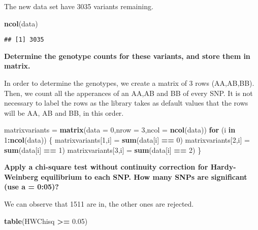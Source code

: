 \documentclass[]{article}
\newenvironment{Shaded}{\begin{snugshade}}{\end{snugshade}}
\newcommand{\KeywordTok}[1]{\textcolor[rgb]{0.13,0.29,0.53}{\textbf{#1}}}
\newcommand{\DataTypeTok}[1]{\textcolor[rgb]{0.13,0.29,0.53}{#1}}
\newcommand{\DecValTok}[1]{\textcolor[rgb]{0.00,0.00,0.81}{#1}}
\newcommand{\FloatTok}[1]{\textcolor[rgb]{0.00,0.00,0.81}{#1}}
\newcommand{\StringTok}[1]{\textcolor[rgb]{0.31,0.60,0.02}{#1}}
\newcommand{\ControlFlowTok}[1]{\textcolor[rgb]{0.13,0.29,0.53}{\textbf{#1}}}
\newcommand{\OperatorTok}[1]{\textcolor[rgb]{0.81,0.36,0.00}{\textbf{#1}}}
\newcommand{\NormalTok}[1]{#1}
\begin{document}
The new data set have 3035 variants remaining.

\begin{Shaded}
\begin{Highlighting}[]
\KeywordTok{ncol}\NormalTok{(data)}
\end{Highlighting}
\end{Shaded}

\begin{verbatim}
## [1] 3035
\end{verbatim}

\textbf{Determine the genotype counts for these variants, and store them
in matrix.}

In order to determine the genotypes, we create a matrix of 3 rows
(AA,AB,BB). Then, we count all the apperances of an AA,AB and BB of
every SNP. It is not necessary to label the rows as the library takes as
default values that the rows will be AA, AB and BB, in this order.

\begin{Shaded}
\begin{Highlighting}[]
\NormalTok{matrixvariants =}\StringTok{ }\KeywordTok{matrix}\NormalTok{(}\DataTypeTok{data =} \DecValTok{0}\NormalTok{,}\DataTypeTok{nrow =} \DecValTok{3}\NormalTok{,}\DataTypeTok{ncol =} \KeywordTok{ncol}\NormalTok{(data))}
\ControlFlowTok{for}\NormalTok{ (i }\ControlFlowTok{in} \DecValTok{1}\OperatorTok{:}\KeywordTok{ncol}\NormalTok{(data))}
\NormalTok{\{}
\NormalTok{  matrixvariants[}\DecValTok{1}\NormalTok{,i] =}\StringTok{ }\KeywordTok{sum}\NormalTok{(data[i] }\OperatorTok{==}\StringTok{ }\DecValTok{0}\NormalTok{)}
\NormalTok{  matrixvariants[}\DecValTok{2}\NormalTok{,i] =}\StringTok{ }\KeywordTok{sum}\NormalTok{(data[i] }\OperatorTok{==}\StringTok{ }\DecValTok{1}\NormalTok{)}
\NormalTok{  matrixvariants[}\DecValTok{3}\NormalTok{,i] =}\StringTok{ }\KeywordTok{sum}\NormalTok{(data[i] }\OperatorTok{==}\StringTok{ }\DecValTok{2}\NormalTok{)}
\NormalTok{\}}
\end{Highlighting}
\end{Shaded}

\textbf{Apply a chi-square test without continuity correction for
Hardy-Weinberg equilibrium to each SNP. How many SNPs are significant
(use a = 0:05)?}

We can observe that 1511 are in, the other ones are rejected.

\begin{Shaded}
\begin{Highlighting}[]
\KeywordTok{table}\NormalTok{(HWChisq }\OperatorTok{>=}\StringTok{ }\FloatTok{0.05}\NormalTok{)}
\end{Highlighting}
\end{Shaded}
\end{document}
